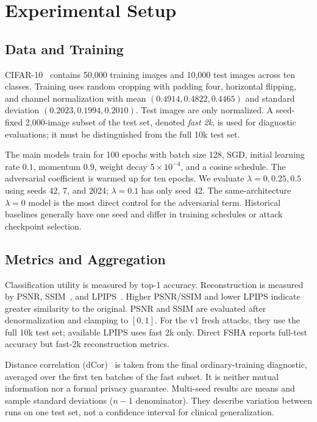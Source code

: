 \section{Experimental Setup}
\subsection{Data and Training}
CIFAR-10~\cite{krizhevsky2009cifar} contains 50,000 training images and 10,000 test images across ten classes. Training uses random cropping with padding four, horizontal flipping, and channel normalization with mean $(0.4914,0.4822,0.4465)$ and standard deviation $(0.2023,0.1994,0.2010)$. Test images are only normalized. A seed-fixed 2,000-image subset of the test set, denoted \emph{fast 2k}, is used for diagnostic evaluations; it must be distinguished from the full 10k test set.

The main models train for 100 epochs with batch size 128, SGD, initial learning rate $0.1$, momentum $0.9$, weight decay $5\times10^{-4}$, and a cosine schedule. The adversarial coefficient is warmed up for ten epochs. We evaluate $\lambda=0,0.25,0.5$ using seeds 42, 7, and 2024; $\lambda=0.1$ has only seed 42. The same-architecture $\lambda=0$ model is the most direct control for the adversarial term. Historical baselines generally have one seed and differ in training schedules or attack checkpoint selection.

\subsection{Metrics and Aggregation}
Classification utility is measured by top-1 accuracy. Reconstruction is measured by PSNR, SSIM~\cite{wang2004ssim}, and LPIPS~\cite{zhang2018lpips}. Higher PSNR/SSIM and lower LPIPS indicate greater similarity to the original. PSNR and SSIM are evaluated after denormalization and clamping to $[0,1]$. For the v1 fresh attacks, they use the full 10k test set; available LPIPS uses fast 2k only. Direct FSHA reports full-test accuracy but fast-2k reconstruction metrics.

Distance correlation (dCor)~\cite{szekely2007dcor} is taken from the final ordinary-training diagnostic, averaged over the first ten batches of the fast subset. It is neither mutual information nor a formal privacy guarantee. Multi-seed results are means and sample standard deviations ($n-1$ denominator). They describe variation between runs on one test set, not a confidence interval for clinical generalization.

